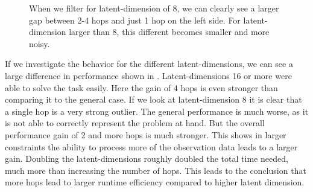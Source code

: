 \begin{figure}[htp]
    \centering
    \hspace{1cm}                       
    \caption{When we filter for latent-dimension of 8, we can clearly see a larger gap between 2-4 hops and just 1 hop on the left side. For latent-dimension larger than 8, this different becomes smaller and more noisy.}
    \label{fig:proof_of_concept_rendezvous_ld}
\end{figure}

If we investigate the behavior for the different latent-dimensions, we can see a large difference in performance shown in . Latent-dimensions 16 or more were able to solve the task easily. Here the gain of 4 hops is even stronger than comparing it to the general case. If we look at latent-dimension 8 it is clear that a single hop is a very strong outlier. The general performance is much worse, as it is not able to correctly represent the problem at hand. But the overall performance gain of 2 and more hops is much stronger. This shows in larger constraints the ability to process more of the observation data leads to a larger gain. Doubling the latent-dimensions roughly doubled the total time needed, much more than increasing the number of hops. This leads to the conclusion that more hops lead to larger runtime efficiency compared to higher latent dimension.


